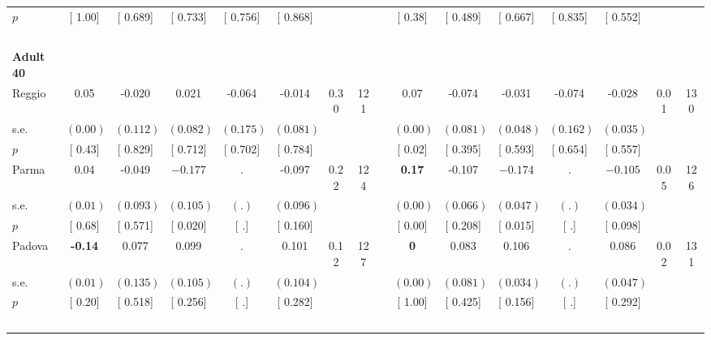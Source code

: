 \begin{longtable}{L{8em} c c c c c c c p{1em} c c c c c c c}
\quad \quad \quad \quad $ p$ & [     1.00] & [    0.689] & [    0.733] & [    0.756] & [    0.868] & & & & [     0.38] & [    0.489] & [    0.667] & [    0.835] & [    0.552] & &  \\[1em]
~\\[1em]
\quad \quad \textbf{Adult 40} & & & & & & & & & & & & & & & \\* 
\quad \quad \quad Reggio& 0.05 &    -0.020 &     0.021 &    -0.064 &    -0.014 &      0.30 &       121 & & 0.07 &    -0.074 &    -0.031 &    -0.074 &    -0.028 &      0.01 &       130  \\*
\quad \quad \quad \quad s.e.& $ (     0.00)$ & $ (    0.112)$ & $ (    0.082)$ & $ (    0.175)$ & $ (    0.081)$ & & & & $ (     0.00)$ & $ (    0.081)$ & $ (    0.048)$ & $ (    0.162)$ & $ (    0.035)$ & &  \\*
\quad \quad \quad \quad $ p$ & [     0.43] & [    0.829] & [    0.712] & [    0.702] & [    0.784] & & & & [     0.02] & [    0.395] & [    0.593] & [    0.654] & [    0.557] & &  \\[1em]
\quad \quad \quad Parma& 0.04 &    -0.049 & $ \mathbf{   -0.177}$ &         . &    -0.097 &      0.22 &       124 & & \textbf{     0.17} &    -0.107 & $ \mathbf{   -0.174}$ &         . & $ \mathbf{   -0.105}$ &      0.05 &       126  \\*
\quad \quad \quad \quad s.e.& $ (     0.01)$ & $ (    0.093)$ & $ (    0.105)$ & $ (        .)$ & $ (    0.096)$ & & & & $ (     0.00)$ & $ (    0.066)$ & $ (    0.047)$ & $ (        .)$ & $ (    0.034)$ & &  \\*
\quad \quad \quad \quad $ p$ & [     0.68] & [    0.571] & [    0.020] & [        .] & [    0.160] & & & & [     0.00] & [    0.208] & [    0.015] & [        .] & [    0.098] & &  \\[1em]
\quad \quad \quad Padova& \textbf{    -0.14} &     0.077 &     0.099 &         . &     0.101 &      0.12 &       127 & & \textbf{0} &     0.083 &     0.106 &         . &     0.086 &      0.02 &       131  \\*
\quad \quad \quad \quad s.e.& $ (     0.01)$ & $ (    0.135)$ & $ (    0.105)$ & $ (        .)$ & $ (    0.104)$ & & & & $ (     0.00)$ & $ (    0.081)$ & $ (    0.034)$ & $ (        .)$ & $ (    0.047)$ & &  \\*
\quad \quad \quad \quad $ p$ & [     0.20] & [    0.518] & [    0.256] & [        .] & [    0.282] & & & & [     1.00] & [    0.425] & [    0.156] & [        .] & [    0.292] & &  \\[1em]
~\\[1em]

\end{longtable}
